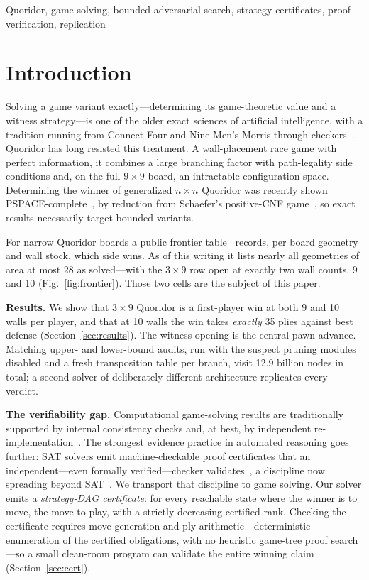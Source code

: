 \documentclass[conference]{IEEEtran}
\begin{document}
\begin{IEEEkeywords}
Quoridor, game solving, bounded adversarial search, strategy certificates, proof verification, replication
\end{IEEEkeywords}

\section{Introduction}
\label{sec:intro}

Solving a game variant exactly---determining its game-theoretic value and a witness strategy---is one of the older exact sciences of artificial intelligence, with a tradition running from Connect Four and Nine Men's Morris through checkers~\cite{allis1988knowledge,gasser1996solving,schaeffer2007checkers,herik2002games}. Quoridor has long resisted this treatment. A wall-placement race game with perfect information, it combines a large branching factor with path-legality side conditions and, on the full $9\times 9$ board, an intractable configuration space. Determining the winner of generalized $n\times n$ Quoridor was recently shown PSPACE-complete~\cite{drop2026quoridor}, by reduction from Schaefer's positive-CNF game~\cite{schaefer1978complexity}, so exact results necessarily target bounded variants.

For narrow Quoridor boards a public frontier table~\cite{slatton2026solving} records, per board geometry and wall stock, which side wins. As of this writing it lists nearly all geometries of area at most 28 as solved---with the $3\times 9$ row open at exactly two wall counts, 9 and 10 (Fig.~\ref{fig:frontier}). Those two cells are the subject of this paper.

\textbf{Results.} We show that $3\times 9$ Quoridor is a first-player win at both 9 and 10 walls per player, and that at 10 walls the win takes \emph{exactly} 35 plies against best defense (Section~\ref{sec:results}). The witness opening is the central pawn advance. Matching upper- and lower-bound audits, run with the suspect pruning modules disabled and a fresh transposition table per branch, visit 12.9 billion nodes in total; a second solver of deliberately different architecture replicates every verdict.

\textbf{The verifiability gap.} Computational game-solving results are traditionally supported by internal consistency checks and, at best, by independent re-implementation~\cite{schaeffer2007checkers,romein2003solving,henderson2009solving}. The strongest evidence practice in automated reasoning goes further: SAT solvers emit machine-checkable proof certificates that an independent---even formally verified---checker validates~\cite{wetzler2014drattrim,heule2016solving,tan2021cakelpr}, a discipline now spreading beyond SAT~\cite{elffers2020justifying}. We transport that discipline to game solving. Our solver emits a \emph{strategy-DAG certificate}: for every reachable state where the winner is to move, the move to play, with a strictly decreasing certified rank. Checking the certificate requires move generation and ply arithmetic---deterministic enumeration of the certified obligations, with no heuristic game-tree proof search---so a small clean-room program can validate the entire winning claim (Section~\ref{sec:cert}).
\end{document}
